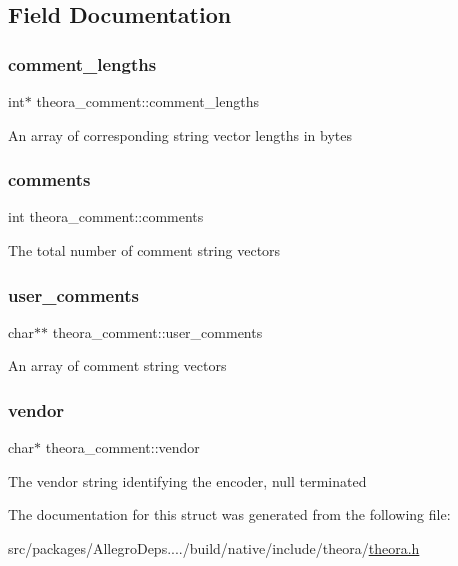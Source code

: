 \subsection{Field Documentation}
\mbox{\label{structtheora__comment_a5ab4a376d3c217282a684577c9c9f49a}} 
\subsubsection{\texorpdfstring{comment\+\_\+lengths}{comment\_lengths}}
{\footnotesize\ttfamily int$\ast$ theora\+\_\+comment\+::comment\+\_\+lengths}

An array of corresponding string vector lengths in bytes \mbox{\label{structtheora__comment_a122393035c8352ff9be42d69e73aee00}} 
\subsubsection{\texorpdfstring{comments}{comments}}
{\footnotesize\ttfamily int theora\+\_\+comment\+::comments}

The total number of comment string vectors \mbox{\label{structtheora__comment_a1e236fd180dfce19be89081399444cf5}} 
\subsubsection{\texorpdfstring{user\+\_\+comments}{user\_comments}}
{\footnotesize\ttfamily char$\ast$$\ast$ theora\+\_\+comment\+::user\+\_\+comments}

An array of comment string vectors \mbox{\label{structtheora__comment_adb371baf8f0daed42af8b875cf8430ef}} 
\subsubsection{\texorpdfstring{vendor}{vendor}}
{\footnotesize\ttfamily char$\ast$ theora\+\_\+comment\+::vendor}

The vendor string identifying the encoder, null terminated 

The documentation for this struct was generated from the following file\+:\begin{DoxyCompactItemize}
\item 
src/packages/\+Allegro\+Deps..../build/native/include/theora/\hyperlink{theora_8h}{theora.\+h}\end{DoxyCompactItemize}
